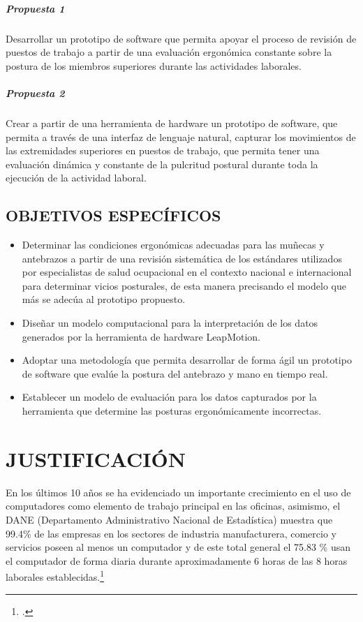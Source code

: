 \paragraph{Propuesta 1}
Desarrollar un prototipo de software que permita apoyar el proceso de revisión de puestos de trabajo a partir de una evaluación ergonómica constante sobre la postura de los miembros superiores durante las actividades laborales.
\paragraph{Propuesta 2}
Crear a partir de una herramienta de hardware un prototipo de software, que permita a través de una interfaz de lenguaje natural, capturar los movimientos de las extremidades superiores en puestos de trabajo, que permita tener una evaluación dinámica y  constante de la pulcritud postural durante toda la ejecución de la actividad laboral. 
\section{OBJETIVOS ESPECÍFICOS}
\begin{itemize}
    \item Determinar las condiciones ergonómicas adecuadas para las muñecas y antebrazos a partir de una revisión sistemática de los estándares utilizados por especialistas de salud ocupacional en el contexto nacional e internacional para determinar vicios posturales,  de esta manera precisando el modelo que más se adecúa al prototipo propuesto.
    \item Diseñar un modelo computacional para la interpretación de los datos generados por la herramienta de hardware LeapMotion.
    \item Adoptar una metodología que permita desarrollar de forma ágil un prototipo de software que evalúe la postura del antebrazo y mano en tiempo real. 
    \item Establecer un modelo de evaluación para los datos capturados por la herramienta que determine las posturas ergonómicamente incorrectas. 
\end{itemize}


\chapter{JUSTIFICACIÓN}
En los últimos 10 años se ha evidenciado un importante crecimiento en el uso de computadores como elemento de trabajo principal en las oficinas, asimismo, el DANE (Departamento Administrativo Nacional de Estadística)  muestra que 99.4\% de las empresas en los sectores de industria manufacturera, comercio y servicios poseen al menos un computador y de este total general el 75.83 \% usan el computador de forma diaria durante aproximadamente 6 horas de las 8 horas laborales establecidas.\footcite[]{Dane2013IndicadoresEmpresas}

